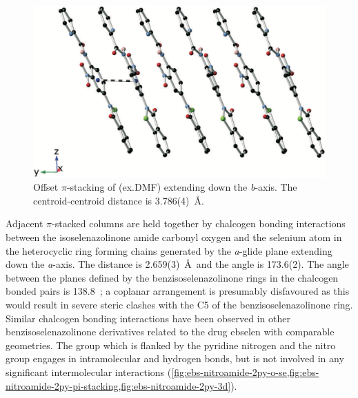 \begin{refsection}
    \begin{figure}
        \centering
        \includegraphics[width=0.8\linewidth]{Figures/ebs-nitroamide-2py-packing.pdf}
        \caption[Offset $\pi$-stacking of (ex.DMF) extending down the \emph{b}-axis.]{Offset $\pi$-stacking of (ex.DMF) extending down the \emph{b}-axis. The centroid-centroid distance is 3.786(4)~\AA.}\label{fig:ebs-nitroamide-2py-packing}
    \end{figure}
    
    Adjacent $\pi$-stacked columns are held together by chalcogen bonding interactions between the isoselenazolinone amide carbonyl oxygen and the selenium atom in the heterocyclic ring forming chains generated by the \emph{a}-glide plane extending down the \emph{a}-axis.
    The  distance is 2.659(3)~\AA~and the  angle is 173.6(2)\degree.
    The angle between the planes defined by the benzisoselenazolinone rings in the chalcogen bonded pairs is 138.8\degree~; a coplanar arrangement is presumably disfavoured as this would result in severe steric clashes with the C5 of the benzisoselenazolinone ring.
    Similar  chalcogen bonding interactions have been observed in other benzisoselenazolinone derivatives related to the drug ebselen with comparable geometries.\autocite{Fellowes2019,Thomas2015,Bhabak2007,Piatek1995}
    The  group which is flanked by the pyridine nitrogen and the nitro group engages in intramolecular  and  hydrogen bonds, but is not involved in any significant intermolecular interactions (\cref{fig:ebs-nitroamide-2py-o-se,fig:ebs-nitroamide-2py-pi-stacking,fig:ebs-nitroamide-2py-3d}).
    

\end{refsection}
